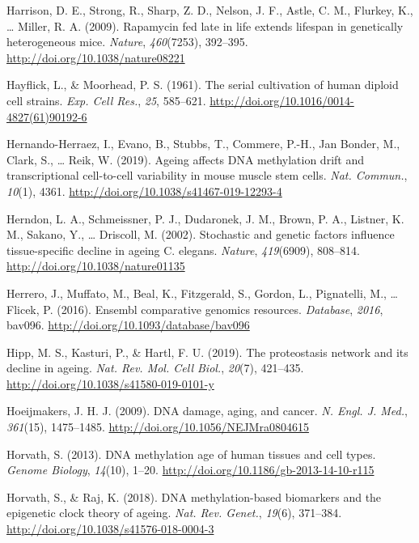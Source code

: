 \documentclass[12pt,twoside]{unicam}
\begin{document}
\begin{cslreferences}
\leavevmode\hypertarget{ref-Harrison2009}{}%
Harrison, D. E., Strong, R., Sharp, Z. D., Nelson, J. F., Astle, C. M., Flurkey, K., \ldots{} Miller, R. A. (2009). Rapamycin fed late in life extends lifespan in genetically heterogeneous mice. \emph{Nature}, \emph{460}(7253), 392--395. \url{http://doi.org/10.1038/nature08221}

\leavevmode\hypertarget{ref-Hayflick1961}{}%
Hayflick, L., \& Moorhead, P. S. (1961). The serial cultivation of human diploid cell strains. \emph{Exp. Cell Res.}, \emph{25}, 585--621. \url{http://doi.org/10.1016/0014-4827(61)90192-6}

\leavevmode\hypertarget{ref-Hernando-Herraez2019}{}%
Hernando-Herraez, I., Evano, B., Stubbs, T., Commere, P.-H., Jan Bonder, M., Clark, S., \ldots{} Reik, W. (2019). Ageing affects DNA methylation drift and transcriptional cell-to-cell variability in mouse muscle stem cells. \emph{Nat. Commun.}, \emph{10}(1), 4361. \url{http://doi.org/10.1038/s41467-019-12293-4}

\leavevmode\hypertarget{ref-Herndon2002}{}%
Herndon, L. A., Schmeissner, P. J., Dudaronek, J. M., Brown, P. A., Listner, K. M., Sakano, Y., \ldots{} Driscoll, M. (2002). Stochastic and genetic factors influence tissue-specific decline in ageing C. elegans. \emph{Nature}, \emph{419}(6909), 808--814. \url{http://doi.org/10.1038/nature01135}

\leavevmode\hypertarget{ref-Herrero2016}{}%
Herrero, J., Muffato, M., Beal, K., Fitzgerald, S., Gordon, L., Pignatelli, M., \ldots{} Flicek, P. (2016). Ensembl comparative genomics resources. \emph{Database}, \emph{2016}, bav096. \url{http://doi.org/10.1093/database/bav096}

\leavevmode\hypertarget{ref-Hipp2019}{}%
Hipp, M. S., Kasturi, P., \& Hartl, F. U. (2019). The proteostasis network and its decline in ageing. \emph{Nat. Rev. Mol. Cell Biol.}, \emph{20}(7), 421--435. \url{http://doi.org/10.1038/s41580-019-0101-y}

\leavevmode\hypertarget{ref-Hoeijmakers2009}{}%
Hoeijmakers, J. H. J. (2009). DNA damage, aging, and cancer. \emph{N. Engl. J. Med.}, \emph{361}(15), 1475--1485. \url{http://doi.org/10.1056/NEJMra0804615}

\leavevmode\hypertarget{ref-Horvath2013}{}%
Horvath, S. (2013). DNA methylation age of human tissues and cell types. \emph{Genome Biology}, \emph{14}(10), 1--20. \url{http://doi.org/10.1186/gb-2013-14-10-r115}

\leavevmode\hypertarget{ref-Horvath2018}{}%
Horvath, S., \& Raj, K. (2018). DNA methylation-based biomarkers and the epigenetic clock theory of ageing. \emph{Nat. Rev. Genet.}, \emph{19}(6), 371--384. \url{http://doi.org/10.1038/s41576-018-0004-3}


\end{cslreferences}
\end{document}
